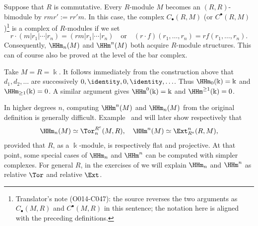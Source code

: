 \begin{remark}
	Suppose that $R$ is commutative. Every $R$-module $M$ becomes an
	$(R,R)$-bimodule by $rmr':=rr'm$. In this case, the complex
	$C_\bullet(R,M)$ (or $C^\bullet(R,M)$)\footnote{Translator's note
	(O014-C047): the source reverses the two arguments as $C_\bullet(M,R)$
	and $C^\bullet(M,R)$ in this sentence; the notation here is aligned with
	the preceding definitions.}
	is a complex of $R$-modules if we set
	\[ r\cdot(m|r_1|\cdots|r_n)=(rm|r_1|\cdots|r_n)
		\quad\text{or}\quad
		(r\cdot f)(r_1,\ldots,r_n)=rf(r_1,\ldots,r_n). \]
	Consequently, $\HHm_n(M)$ and $\HHm^n(M)$ both acquire $R$-module
	structures. This can of course also be proved at the level of the bar
	complex.
\end{remark}

\begin{example}
	Take $M=R=\Bbbk$. It follows immediately from the construction above that
	$d_1,d_2,\ldots$ are successively $0,\identity,0,\identity,\ldots$.
	Thus $\HHm_0(\Bbbk)=\Bbbk$ and $\HHm_{\geq1}(\Bbbk)=0$. A similar
	argument gives $\HHm^0(\Bbbk)=\Bbbk$ and
	$\HHm^{\geq1}(\Bbbk)=0$.
\end{example}

In higher degrees $n$, computing $\HHm^n(M)$ and $\HHm_n(M)$ from the
original definition is generally difficult.
Example~ and
 will later show respectively that
\[ \HHm_n(M) \simeq \Tor^{R^e}_n(M, R), \quad
	\HHm^n(M) \simeq \Ext_{R^e}^n(R, M), \]
provided that $R$, as a $\Bbbk$-module, is respectively flat and projective.
At that point, some special cases of $\HHm_n$ and $\HHm^n$ can be computed
with simpler complexes. For general $R$, in the exercises of
 we will explain $\HHm_n$ and
$\HHm^n$ as relative $\Tor$ and relative $\Ext$.

